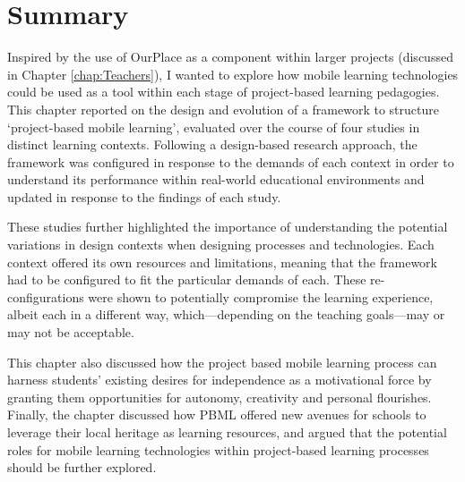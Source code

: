 \section{Summary}
Inspired by the use of OurPlace as a component within larger projects (discussed in Chapter \ref{chap:Teachers}), I wanted to explore how mobile learning technologies could be used as a tool within each stage of project-based learning pedagogies. This chapter reported on the design and evolution of a framework to structure `project-based mobile learning', evaluated over the course of four studies in distinct learning contexts. Following a design-based research approach, the framework was configured in response to the demands of each context in order to understand its performance within real-world educational environments and updated in response to the findings of each study.

These studies further highlighted the importance of understanding the potential variations in design contexts when designing processes and technologies. Each context offered its own resources and limitations, meaning that the framework had to be configured to fit the particular demands of each. These re-configurations were shown to potentially compromise the learning experience, albeit each in a different way, which---depending on the teaching goals---may or may not be acceptable.

This chapter also discussed how the project based mobile learning process can harness students' existing desires for independence as a motivational force by granting them opportunities for autonomy, creativity and personal flourishes. Finally, the chapter discussed how PBML offered new avenues for schools to leverage their local heritage as learning resources, and argued that the potential roles for mobile learning technologies within project-based learning processes should be further explored.
